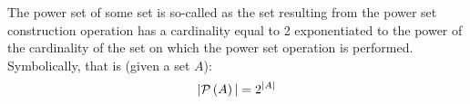 \documentclass[main.tex]{subfiles}
\begin{document}
\subproblem{}\label{8e}

\begin{remark}
	The power set of some set is so-called as the set resulting from the
	power set construction operation has a cardinality equal to 2
	exponentiated to the power of the cardinality of the set on which the
	power set operation is performed. Symbolically, that is (given a set
	\(A\)):
	\[\vert{} \mathcal{P}\left(A\right) \vert{} = 2^{\vert{} A \vert{}}\]
\end{remark}
\end{document}
